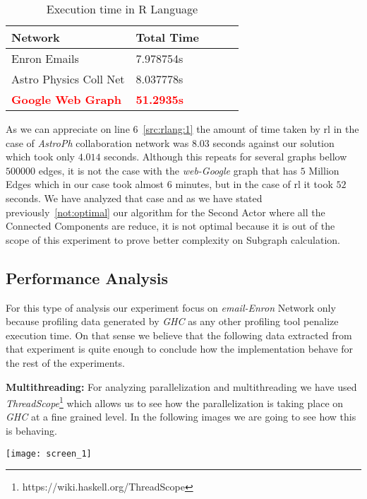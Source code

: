 \documentclass[12pt]{article}
\begin{document}
\begin{table}[H]
  \centering
  \begin{tabular}{|l|l|l|l|l|}
   \hline
   \textbf{Network} & \textbf{Total Time}\\
   \hline
   Enron Emails & 7.978754s \\
   \hline
   Astro Physics Coll Net & 8.037778s \\
   \hline
   \textbf{\textcolor{red}{Google Web Graph}} & \textbf{\textcolor{red}{51.2935s}} \\
   \hline
  \end{tabular}
 \caption{Execution time in R Language}
 \label{table:6}
 \end{table}

As we can appreciate on line 6~\ref{src:rlang:1} the amount of time taken by \acrshort{rl} in the case of \textit{AstroPh} collaboration network was $8.03$ seconds against
our solution which took only $4.014$ seconds. 
Although this repeats for several graphs bellow $500000$ edges, it is not the case with the \textit{web-Google} graph that has $5$ Million Edges which in our case took almost $6$ minutes, 
but in the case of \acrshort{rl} it took $52$ seconds. We have analyzed that case and as we have stated previously~\ref{not:optimal} our algorithm for the Second Actor where all the Connected Components are 
reduce, it is not optimal because it is out of the scope of this experiment to prove better complexity on Subgraph calculation.

\subsection{Performance Analysis}
For this type of analysis our experiment focus on \textit{email-Enron} Network only because profiling data generated by \textit{GHC} as any other profiling tool penalize execution time. 
On that sense we believe that the following data extracted from that experiment is quite enough to conclude how the implementation behave for the rest of the experiments.

\textbf{Multithreading:} For analyzing parallelization and multithreading we have used \textit{ThreadScope}\footnote{https://wiki.haskell.org/ThreadScope} which allows us to see how the parallelization is taking place
on \textit{GHC} at a fine grained level. In the following images we are going to see how this is behaving.

\begin{minipage}[t]{\linewidth}
  \texttt{[image: screen\_1]}
  \captionsetup{type=figure}
  \label{fig:1}
\end{minipage}
\end{document}
